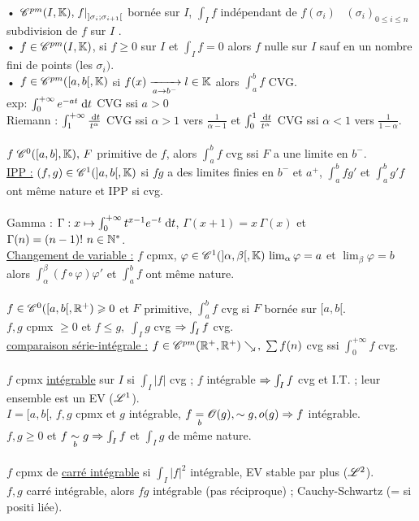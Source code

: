 \documentclass[12 pt]{book}
\begin{document}
• $\mathscr{C}^{pm}(I,\mathbb{K}), \left.f\right|_{]\sigma_i;\sigma_{i+1}[}$ bornée sur $I$, $\int_I f$ indépendant de $f(\sigma_i)$ \ $(\sigma_i)_{0\leqslant i \leqslant n}$ subdivision de $f$ sur $I$ .\\
• $f\in \mathscr{C}^{pm}(I,\mathbb{K})$, si $f\geqslant0$ sur $I$ et $\int_I f =0$ alors $f$ nulle sur $I$ sauf en un nombre fini de points (les $\sigma_i)$.\\
• $f\in\mathscr{C}^{pm}([a,b[,\mathbb{K})$ si $f(x)\xrightarrow[a\to b^-]{} l\in\mathbb{K}$ alors $\int_a^b f$ CVG.\\
exp: $\int_0^{+\infty} e^{-at} \; \text{d}t$ CVG ssi $a>0$\\
Riemann : $\int_1^{+\infty} \frac{\; \text{d}t}{t^\alpha}$ CVG ssi $\alpha>1$ vers $\frac{1}{\alpha -1}$ \; et $\int_0^1 \frac{\; \text{d}t}{t^\alpha}$ CVG ssi $\alpha<1$ vers $\frac{1}{1-\alpha}$.\\
\text{}\\
$f\; \mathscr{C}^0([a,b],\mathbb{K}), \, F$ primitive de $f$, alors $\int_a^b f$ cvg ssi $F$ a une limite en $b^-$.\\
\underline{IPP :} $(f,g)\in\mathscr{C}^1(]a,b[, \mathbb{K})$ si $fg$ a des limites finies en $b^-$ et $a^+$, $\int_a^b fg'$ et $\int_a^b g'f$ ont même nature et IPP si cvg.\\
\text{}\\
Gamma : $\Gamma : x\mapsto \int_0^{+\infty} t^{x-1}e^{-t} \; \text{d}t$, $\Gamma(x+1) = x\,\Gamma(x)$ et $\Gamma(n) = (n-1)! \ n\in\N^*$.\\
\underline{Changement de variable :} $f$ cpmx, $\varphi\in \mathscr{C}^1(]\alpha, \beta[,\mathbb{K}) \, \lim_\alpha \varphi = a$ et $\lim_\beta \varphi = b$ alors $\int_\alpha^\beta (f\circ \varphi) \varphi'$ et $\int_a^b f$ ont même nature.\\
\text{}\\
$f\in\mathscr{C}^0([a,b[,\mathbb{R}^+) \geqslant 0$ et $F$ primitive, $\int_a^b f$ cvg si $F$ bornée sur $[a,b[$.\\
$f,g$ cpmx $\geqslant 0$ et $f\leqslant g, \; \int_I g$ cvg $\Rightarrow \int_I f$ cvg.\\
\underline{comparaison série-intégrale :} $f\in\mathscr{C}^{pm}(\mathbb{R}^+,\mathbb{R}^+) \searrow\,, \; \sum f(n)$ cvg ssi $\int_0^{+\infty}f$ cvg.\\
\text{}\\
$f$ cpmx \underline{intégrable} sur $I$ si $\int_I |f|$ cvg ; $f$ intégrable $\Rightarrow \int_I f$ cvg et I.T. ; leur ensemble est un EV ($\mathscr{L}^1$).\\
$I=[a,b[, \, f,g$ cpmx et $g$ intégrable, $f\underset{b}{=} \mathscr{O}(g), \sim g, o(g) \Rightarrow f$ intégrable.\\
$f,g\geqslant0$ et $f\underset{b}{\sim} g \Rightarrow \int_I f$ et $\int_I g$ de même nature.\\
\text{}\\
$f$ cpmx de \underline{carré intégrable} si $\int_I|f|^2$ intégrable, EV stable par plus ($\mathscr{L}^2$).\\
$f,g$ carré intégrable, alors $fg$ intégrable (pas réciproque) ; Cauchy-Schwartz (= si positi liée).\\
\end{document}
